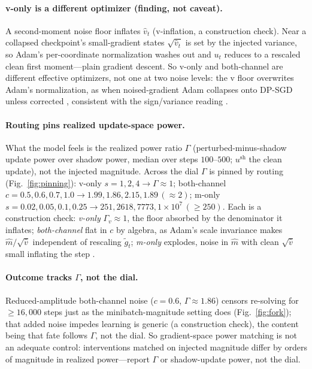 \documentclass[10pt]{article}
\begin{document}
\paragraph{v-only is a different optimizer (finding, not caveat).}
A second-moment noise floor inflates $\hat v_t$ (v-inflation, a construction
check). Near a collapsed checkpoint's small-gradient states $\sqrt{\hat v_t}$ is
set by the injected variance, so Adam's per-coordinate normalization washes out
and $u_t$ reduces to a rescaled clean first moment---plain gradient descent. So
v-only and both-channel are different effective optimizers, not one at two noise
levels: the v floor overwrites Adam's normalization, as when noised-gradient Adam
collapses onto DP-SGD unless corrected \citep{dpadambc,litramer}, consistent with
the sign/variance reading \citep{balleshennig,kunstner}.

\paragraph{Routing pins realized update-space power.}
What the model feels is the realized power ratio $\Gamma$ (perturbed-minus-shadow
update power over shadow power, median over steps $100$--$500$; $u^{\mathrm{sh}}$
the clean update), not the injected magnitude. Across the dial $\Gamma$ is pinned
by routing (Fig.~\ref{fig:pinning}): v-only $s{=}1,2,4\!\to\!\Gamma\!\approx\!1$;
both-channel $c{=}0.5,0.6,0.7,1.0\!\to\!1.99,1.86,2.15,1.89\,(\approx2)$; m-only
$s{=}0.02,0.05,0.1,0.25\!\to\!251,2618,7773,1{\times}10^{7}\,(\ge250)$. Each is a
construction check: \emph{v-only} $\Gamma_v\!\approx\!1$, the floor absorbed by the
denominator it inflates; \emph{both-channel} flat in $c$ by algebra, as Adam's
scale invariance \citep{adam} makes $\hat m/\sqrt{\hat v}$ independent of rescaling
$\tilde g_t$; \emph{m-only} explodes, noise in $\hat m$ with clean $\sqrt{\hat v}$
small inflating the step \citep{amsgrad}.

\paragraph{Outcome tracks $\Gamma$, not the dial.}
Reduced-amplitude both-channel noise ($c=0.6$, $\Gamma\!\approx\!1.86$) censors
re-solving for $\ge\!16{,}000$ steps just as the minibatch-magnitude setting does
(Fig.~\ref{fig:fork}); that added noise impedes learning is generic (a
construction check), the content being that fate follows $\Gamma$, not the dial.
So gradient-space power matching is not an adequate control: interventions matched
on injected magnitude differ by orders of magnitude in realized power---report
$\Gamma$ or shadow-update power, not the dial.
\end{document}
